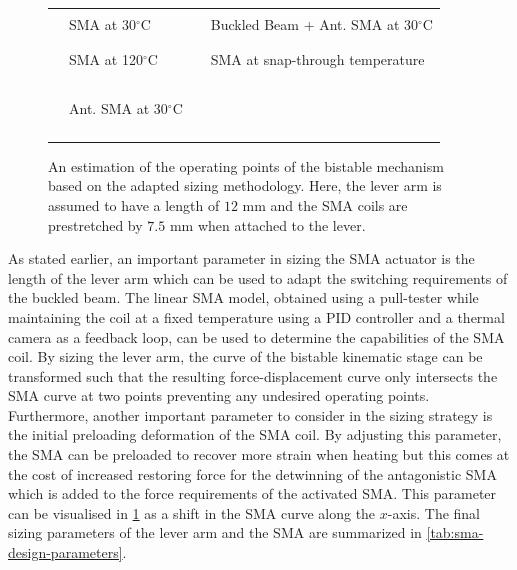 \begin{figure}[hbt!] %
  \centering
  \resizebox{0.75\textwidth}{!}{}
  \begin{tabular}{l@{ }l l@{ }l}
    {\color{myblue} \rule[2pt]{10pt}{0.5mm} } & {\footnotesize SMA at 30$^{\circ}$C} & {\color{mygreen} \rule[2pt]{10pt}{0.5mm}} & {\footnotesize Buckled Beam + Ant. SMA at 30$^{\circ}$C}\\
    {\color{myred} \rule[2pt]{10pt}{0.5mm} } & {\footnotesize SMA at 120$^{\circ}$C} & {\color{myblack} \dottedrule} & {\footnotesize SMA at snap-through temperature}\\
    {\color{myblue} \rule[2pt]{1pt}{0.5mm} \rule[2pt]{1pt}{0.5mm} \rule[2pt]{1pt}{0.5mm}} & {\footnotesize Ant. SMA at 30$^{\circ}$C} & \\
  \end{tabular}
  \caption{An estimation of the operating points of the bistable mechanism based on the adapted sizing methodology. Here, the lever arm is assumed to have a length of $12$ mm and the SMA coils are prestretched by $7.5$ mm when attached to the lever.}
  \label{fig:smabb-sizing}
\end{figure}

As stated earlier, an important parameter in sizing the SMA actuator is the length of the lever arm which can be used to adapt the switching requirements of the buckled beam. The linear SMA model, obtained using a pull-tester while maintaining the coil at a fixed temperature using a PID controller and a thermal camera as a feedback loop, can be used to determine the capabilities of the SMA coil. By sizing the lever arm, the curve of the bistable kinematic stage can be transformed such that the resulting force-displacement curve only intersects the SMA curve at two points preventing any undesired operating points. Furthermore, another important parameter to consider in the sizing strategy is the initial preloading deformation of the SMA coil. By adjusting this parameter, the SMA can be preloaded to recover more strain when heating but this comes at the cost of increased restoring force for the detwinning of the antagonistic SMA which is added to the force requirements of the activated SMA. This parameter can be visualised in \cref{fig:smabb-sizing} as a shift in the SMA curve along the $x$-axis. The final sizing parameters of the lever arm and the SMA are summarized in \cref{tab:sma-design-parameters}.

